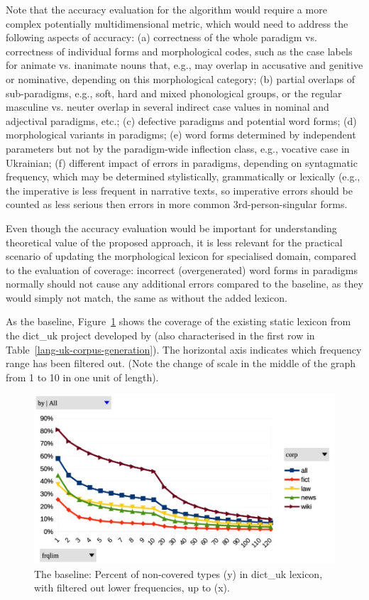 \documentclass[11pt,a4paper]{article}
\begin{document}
Note that the accuracy evaluation for the algorithm would require a more complex potentially multidimensional metric, which would need to address the following aspects of accuracy: (a) correctness of the whole paradigm vs. correctness of individual forms and morphological codes, such as the case labels for animate vs. inanimate nouns that, e.g., may overlap in accusative and genitive or nominative, depending on this morphological category; (b) partial overlaps of sub-paradigms, e.g., soft, hard and mixed phonological groups, or the regular masculine vs. neuter overlap in several indirect case values in nominal and adjectival paradigms, etc.; (c) defective paradigms and potential word forms; (d) morphological variants in paradigms; (e) word forms determined by independent parameters but not by the paradigm-wide inflection class, e.g., vocative case in Ukrainian; (f) different impact of errors in paradigms, depending on syntagmatic frequency, which may be determined stylistically, grammatically or lexically (e.g., the imperative is less frequent in narrative texts, so imperative errors should be counted as less serious then errors in more common 3rd-person-singular forms.

Even though the accuracy evaluation would be important for understanding theoretical value of the proposed approach, it is less relevant for the practical scenario of updating the morphological lexicon for specialised domain, compared to the evaluation of coverage: incorrect (overgenerated) word forms in paradigms normally should not cause any additional errors compared to the baseline, as they would simply not match, the same as without the added lexicon.


As the baseline, Figure~\ref{fig:pcNoTypDictUK} shows the coverage of the existing static lexicon from the dict\_uk project developed by \cite{Rysin-Starko-2019} (also characterised in the first row in Table~\ref{lang-uk-corpus-generation}). The horizontal axis indicates which frequency range has been filtered out. (Note the change of scale in the middle of the graph from 1 to 10 in one unit of length).

\begin{figure}
	\includegraphics[width=\linewidth]{evaluation-coverage-dict_uk.jpg}
	\caption{The baseline: Percent of non-covered types (y) in dict\_uk lexicon, with filtered out lower frequencies, up to (x).}
	\label{fig:pcNoTypDictUK}
\end{figure}
\end{document}
